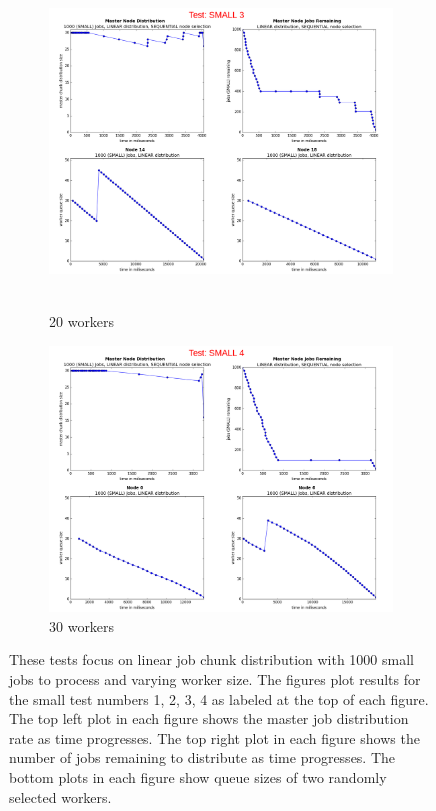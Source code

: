 \documentclass{article}
\begin{document}
\begin{figure}[p]
  
  \begin{subfigure}[b]{0.5\linewidth}
    \centering
    \hbox{\hspace{-5.0em} \includegraphics[width=1.2\linewidth]{combined_small_growing_workers_linear/case_small_3} }
    \caption{20 workers} 
    \label{testLinearSmall20} 
    \vspace{4ex}
  \end{subfigure}%
  \begin{subfigure}[b]{0.5\linewidth}
    \centering
    \includegraphics[width=1.2\linewidth]{combined_small_growing_workers_linear/case_small_4} 
    \caption{30 workers} 
    \label{testLinearSmall30} 
    \vspace{4ex}
  \end{subfigure} 
  
  
  \caption{These tests focus on linear job chunk distribution with 1000 small jobs to process and varying worker size. The figures plot results for the small test numbers 1, 2, 3, 4 as labeled at the top of each figure. The top left plot in each figure shows the master job distribution rate as time progresses. The top right plot in each figure shows the number of jobs remaining to distribute as time progresses. The bottom plots in each figure show queue sizes of two randomly selected workers. }
  \label{testsSmallLinear} 
  
\end{figure}
\end{document}

